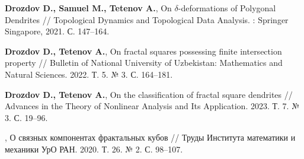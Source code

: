 \begin{thebibliography}{99}
{\bf Drozdov D., Samuel M., Tetenov A.}, 
On $\delta$-deformations of Polygonal Dendrites // 
Topological Dynamics and Topological Data Analysis. : Springer Singapore, 2021. С. 147--164.

{\bf Drozdov D., Tetenov A.}, 
On fractal squares possessing finite intersection property // 
Bulletin of National University of Uzbekistan: Mathematics and Natural Sciences. 2022. Т. 5. № 3. С. 164--181.

{\bf Drozdov D., Tetenov A.}, 
On the classification of fractal square dendrites // 
Advances in the Theory of Nonlinear Analysis and Its Application. 2023. Т. 7. № 3. С. 19--96.

,
О связных компонентах фрактальных кубов // 
Труды Института математики и механики УрО РАН. 2020. Т. 26. № 2. С. 98--107.


\end{thebibliography}